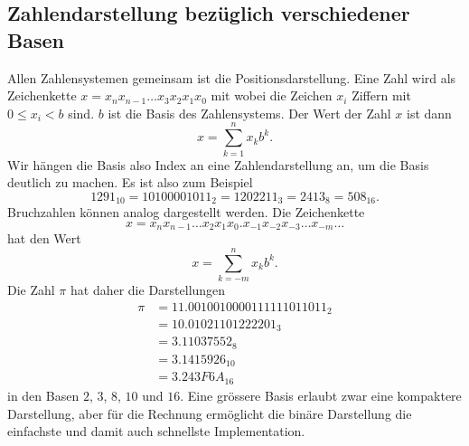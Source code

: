 \subsection{Zahlendarstellung bezüglich verschiedener Basen
\label{buch:subsection:basen}}
Allen Zahlensystemen gemeinsam ist die Positionsdarstellung.
Eine Zahl wird als Zeichenkette $x=x_nx_{n-1}\dots x_3x_2x_1x_0$ mit
wobei die Zeichen $x_i$ Ziffern mit $0 \le x_i < b$ sind.
$b$ ist die Basis des Zahlensystems.
Der Wert der Zahl $x$ ist dann 
\[
x
=
\sum_{k=1}^n x_kb^k.
\]
Wir hängen die Basis also Index an eine Zahlendarstellung an, um die
Basis deutlich zu machen.
Es ist also zum Beispiel
\[
1291_{10}
=
10100001011_2
=
1202211_3
=
2413_8
=
508_{16}.
\]
Bruchzahlen können analog dargestellt werden.
Die Zeichenkette
\[
x = x_{n}x_{n-1}\dots x_2x_1x_0\texttt{.}x_{-1}x_{-2}x_{-3}\dots x_{-m}\dots
\]
hat den Wert
\[
x = \sum_{k=-m}^n x_kb^k.
\]
Die Zahl $\pi$ hat daher die Darstellungen
\begin{align*}
\pi
&=
11.0010010000111111011011_2
\\
&=
10.01021101222201_3
\\
&=
3.11037552_8
\\
&=
3.1415926_{10}
\\
&=
3.243F6A_{16}
\end{align*}
in den Basen $2$, $3$, $8$, $10$ und $16$.
Eine grössere Basis erlaubt zwar eine kompaktere Darstellung, aber
für die Rechnung ermöglicht die binäre Darstellung die einfachste
und damit auch schnellste Implementation.


